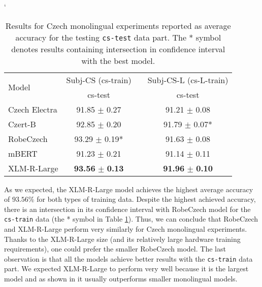 \documentclass[10pt, a4paper]{article}
\begin{document}
\begin{table}[ht!]
\catcode`
\begin{adjustbox}{width=0.95\linewidth,center}
\begin{tabular}{lccc} \toprule
 \multirow{2}{*}{Model}                       & \multicolumn{1}{c}{Subj-CS (cs-train)}  &   & \multicolumn{1}{c}{Subj-CS-L (cs-L-train)}                                  \\ \cline{2-2} \cline{4-4} 
        & \multicolumn{1}{c}{cs-test}  &       & \multicolumn{1}{c}{cs-test}     \\ \midrule
Czech Electra & 91.85 $\pm$ 0.27\phantom{*}  & & 91.21 $\pm$ 0.08\phantom{*} \\
Czert-B    & 92.85 $\pm$ 0.20\phantom{*}  & & 91.79 $\pm$ 0.07* \\
RobeCzech    & 93.29 $\pm$ 0.19*   & & 91.63 $\pm$ 0.08\phantom{*} \\
mBERT        & 91.23 $\pm$ 0.21\phantom{*}  & & 91.14 $\pm$ 0.11\phantom{*} \\
XLM-R-Large  & \textbf{93.56} $\pm$ \textbf{0.13}\phantom{*}  & & \textbf{91.96} $\pm$ \textbf{0.10\phantom{*}} \\ \bottomrule
\end{tabular}
\end{adjustbox}
\caption{Results for Czech monolingual experiments reported as average accuracy for the testing \texttt{cs-test} data part. The * symbol denotes results containing intersection in confidence interval with the best model.} \label{tab:monolingual-cs}
\end{table}

\par As we expected, the XLM-R-Large model achieves the highest average accuracy of $93.56\%$ for both types of training data. Despite the highest achieved accuracy, there is an intersection in its confidence interval with RobeCzech model for the \texttt{cs-train} data
(the * symbol in Table \ref{tab:monolingual-cs}). Thus, we can conclude that RobeCzech and XLM-R-Large perform very similarly for Czech monolingual experiments. Thanks to the XLM-R-Large size (and its relatively large hardware training requirements), one could prefer the smaller RobeCzech model. The last observation is that all the models achieve better results with the \texttt{cs-train} data part. We expected XLM-R-Large to perform very well because it is the largest model and as shown in \cite{priban-steinberger-2021-multilingual} it usually outperforms smaller monolingual models.
\end{document}
